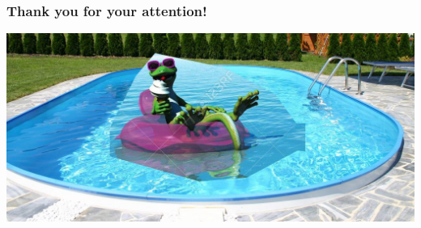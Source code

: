 \documentclass{beamer}
\begin{document}



\begin{frame}
    \frametitle{Thank you for your attention!}
 	\includegraphics[width=\textwidth]{img/important.jpg}
\end{frame}
\end{document}
